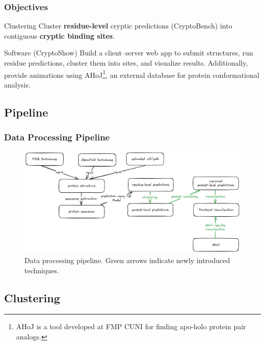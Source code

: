 \documentclass[aspectratio=169]{beamer}
\begin{document}
\begin{frame}
  \frametitle{Objectives}
  \begin{block}{Clustering}
    Cluster \textbf{residue-level} cryptic predictions (CryptoBench) into contiguous \textbf{cryptic binding sites}.
  \end{block}

  \begin{block}{Software (CryptoShow)}
    Build a client–server web app to submit structures, run residue predictions, cluster them into sites, and visualize results. Additionally, provide animations using AHoJ\footnote{AHoJ is a tool developed at FMP CUNI for finding apo-holo protein pair analogs.}, an external database for protein conformational analysis.
  \end{block}
\end{frame}

\subsection{Pipeline}

\begin{frame}
  \frametitle{Data Processing Pipeline}

  \begin{figure}
    \includegraphics[width=\textwidth]{fig/pipeline.png}
    \caption{Data processing pipeline. \textcolor{ITMOdarkgreen}{Green arrows} indicate newly introduced techniques.}
  \end{figure}

\end{frame}

\subsection{Clustering}
\end{document}

